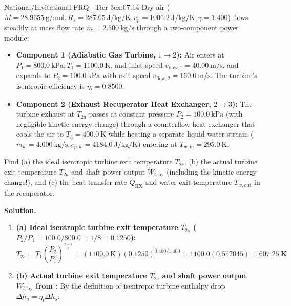 \begin{workedexample}{National/Invitational FRQ \textbar\ Tier 3}{ex:07.14}
Dry air ($M = \SI{28.9655}{\gram\per\mole}, R_s = \SI{287.05}{\joule\per\kilogram\per\kelvin}, c_p = \SI{1006.2}{\joule\per\kilogram\per\kelvin}, \gamma = 1.400$) flows steadily at mass flow rate $\dot{m} = \SI{2.500}{\kilogram\per\second}$ through a two-component power module:
\begin{itemize}
  \item \textbf{Component 1 (Adiabatic Gas Turbine, $1\to 2$):} Air enters at $P_1 = \SI{800.0}{\kilo\pascal}, T_1 = \SI{1100.0}{\kelvin}$, and inlet speed $v_{\mathrm{flow},1} = \SI{40.00}{\meter\per\second}$, and expands to $P_2 = \SI{100.0}{\kilo\pascal}$ with exit speed $v_{\mathrm{flow},2} = \SI{160.0}{\meter\per\second}$. The turbine's isentropic efficiency is $\eta_t = 0.8500$.
  \item \textbf{Component 2 (Exhaust Recuperator Heat Exchanger, $2\to 3$):} The turbine exhaust at $T_{2a}$ passes at constant pressure $P_2 = \SI{100.0}{\kilo\pascal}$ (with negligible kinetic energy change) through a counterflow heat exchanger that cools the air to $T_3 = \SI{400.0}{\kelvin}$ while heating a separate liquid water stream ($\dot{m}_w = \SI{4.000}{\kilogram\per\second}, c_{p,w} = \SI{4184.0}{\joule\per\kilogram\per\kelvin}$) entering at $T_{w,\mathrm{in}} = \SI{295.0}{\kelvin}$.
\end{itemize}
Find (a) the ideal isentropic turbine exit temperature $T_{2s}$, (b) the actual turbine exit temperature $T_{2a}$ and shaft power output $\dot{W}_{t,\mathrm{by}}$ (including the kinetic energy change!), and (c) the heat transfer rate $\dot{Q}_{\mathrm{HX}}$ and water exit temperature $T_{w,\mathrm{out}}$ in the recuperator.
\par\smallskip\noindent
\textbf{Solution.}
\begin{enumerate}
  \item \textbf{(a) Ideal isentropic turbine exit temperature $T_{2s}$ ($P_2/P_1 = 100.0/800.0 = 1/8 = 0.1250$):}
  \[
    T_{2s} = T_1\left(\frac{P_2}{P_1}\right)^{\frac{\gamma - 1}{\gamma}} = (\SI{1100.0}{\kelvin})(0.1250)^{0.400/1.400} = 1100.0(0.552045) = \mathbf{\SI{607.25}{\kelvin}}
  \]
  \item \textbf{(b) Actual turbine exit temperature $T_{2a}$ and shaft power output $\dot{W}_{t,\mathrm{by}}$ from :}
  By the definition of isentropic turbine enthalpy drop $\Delta h_a = \eta_t \Delta h_s$:

\end{enumerate}
\end{workedexample}
